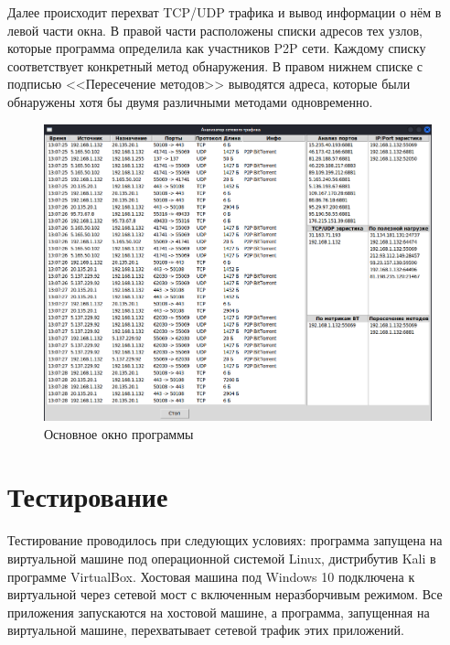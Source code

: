 \documentclass[bachelor, och, coursework]{SCWorks}
\begin{document}
Далее происходит перехват TCP/UDP трафика и вывод информации о нём в левой части окна. В правой части расположены списки адресов тех узлов, которые программа определила как участников P2P сети. Каждому списку соответствует конкретный метод обнаружения. В правом нижнем списке с подписью <<Пересечение методов>> выводятся адреса, которые были обнаружены хотя бы двумя различными методами одновременно.

\begin{figure}[H]
    \centering
    \includegraphics[width=1\textwidth]{window.png}
    \caption{Основное окно программы}
\end{figure}

\section{Тестирование}
Тестирование проводилось при следующих условиях: программа запущена на виртуальной машине под операционной системой Linux, дистрибутив Kali в программе VirtualBox. Хостовая машина под Windows 10 подключена к виртуальной через сетевой мост с включенным неразборчивым режимом. Все приложения запускаются на хостовой машине, а программа, запущенная на виртуальной машине, перехватывает сетевой трафик этих приложений.
\end{document}
